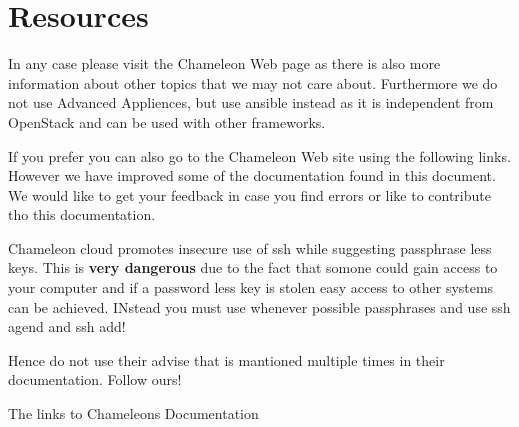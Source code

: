 \FILENAME

\section{Resources}

In any case please visit the Chameleon Web page as there is also more
information about other topics that we may not care about. Furthermore
we do not use Advanced Appliences, but use ansible instead as it is
independent from OpenStack and can be used with other frameworks.

If you prefer you can also go to the Chameleon Web site using the
following links. However we have improved some of the documentation
found in this document. We would like to get your feedback in case you
find errors or like to contribute tho this documentation.

\begin{WARNING}
  Chameleon cloud promotes insecure use of ssh while suggesting
  passphrase less keys. This is {\bf very dangerous} due to the fact
  that somone could gain access to your computer and if a password
  less key is stolen easy access to other systems can be
  achieved. INstead you must use whenever possible passphrases and use
  ssh agend and ssh add!

  Hence do not use their advise that is mantioned multiple times in
  their documentation. Follow ours!
\end{WARNING}

The links to Chameleons Documentation 

